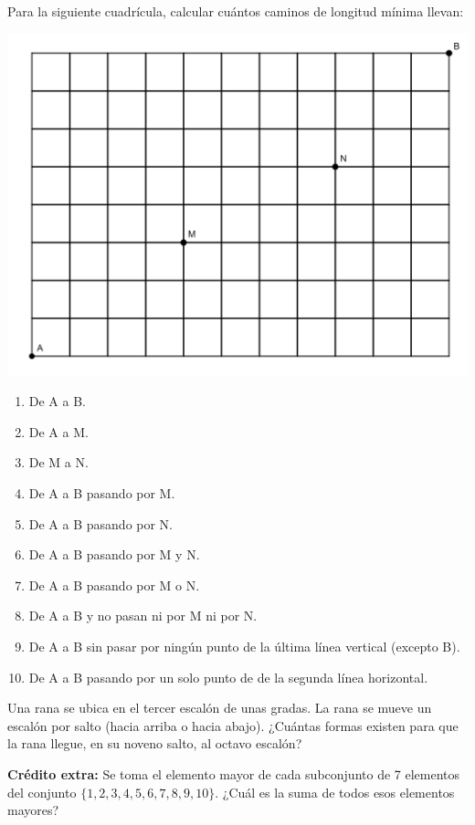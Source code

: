 \documentclass[12pt]{article}
\begin{document}
\begin{problema}
    Para la siguiente cuadrícula, calcular cuántos caminos de longitud mínima llevan:

    \begin{center}
        \includegraphics[scale=1]{Imagenes/IMG3/Caminos.png}
    \end{center}

    \renewcommand{\labelenumi}{\alph{enumi})}
    \begin{enumerate}
        \item De A a B.
        \item De A a M.
        \item De M a N.
        \item De A a B pasando por M.
        \item De A a B pasando por N.
        \item De A a B pasando por M y N.
        \item De A a B pasando por M o N.
        \item De A a B y no pasan ni por M ni por N.
        \item De A a B sin pasar por ningún punto de la última línea vertical (excepto B).
        \item De A a B pasando por un solo punto de de la segunda línea horizontal.
    \end{enumerate}
\end{problema}

\begin{problema}
    Una rana se ubica en el tercer escalón de unas gradas. La rana se mueve un escalón por salto (hacia arriba o hacia abajo). ¿Cuántas formas existen para que la rana llegue, en su noveno salto, al octavo escalón?
\end{problema}

\textbf{Crédito extra:} Se toma el elemento mayor de cada subconjunto de 7 elementos del conjunto $\{ 1,2,3,4,5,6,7,8,9,10 \}$. ¿Cuál es la suma de todos esos elementos mayores?
\end{document}
